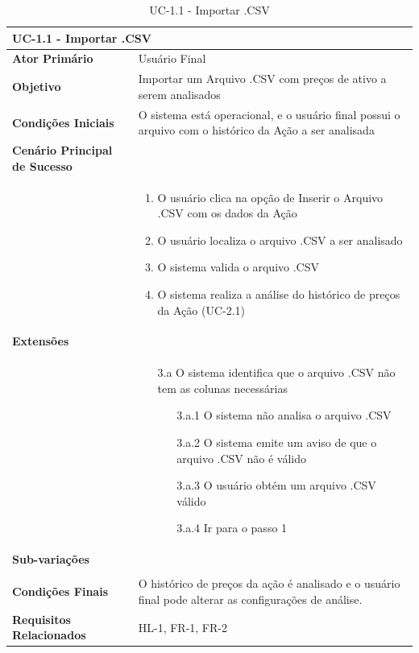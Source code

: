 \documentclass[12pt]{article}
\begin{document}
\begingroup
\renewcommand*{\arraystretch}{1.2}
\begin{table}[H]
	\caption{UC-1.1 - Importar .CSV}
	\label{tab:UC-1.1}
	\begin{tabular}{p{6cm} p{8cm}}
		\multicolumn{2}{l}{\large{\textbf{UC-1.1 - Importar .CSV}}}\\
		\toprule
		\textbf{Ator Primário}		&	Usuário Final \\
		\midrule
		\textbf{Objetivo}			&	Importar um Arquivo .CSV com preços de ativo a serem analisados \\
		\midrule
		\textbf{Condições Iniciais}	&	O sistema está operacional, e o usuário final possui
										o arquivo com o histórico da Ação a ser analisada \\
		\midrule
		\textbf{Cenário Principal de Sucesso}	& \\
		& \begin{enumerate}
			\item O usuário clica na opção de Inserir o Arquivo .CSV com os dados da Ação
			\item O usuário localiza o arquivo .CSV a ser analisado
			\item O sistema valida o arquivo .CSV
			\item O sistema realiza a análise do histórico de preços da Ação (UC-2.1)
		\end{enumerate}\\
		\midrule
		\textbf{Extensões}	& \\
		& \begin{enumerate}
			\item[3.a] O sistema identifica que o arquivo .CSV não tem as colunas necessárias
			\begin{enumerate}
				\item[3.a.1] O sistema não analisa o arquivo .CSV
				\item[3.a.2] O sistema emite um aviso de que o arquivo .CSV não é válido
				\item[3.a.3] O usuário obtém um arquivo .CSV válido
				\item[3.a.4] Ir para o passo 1 
			\end{enumerate}
		\end{enumerate}\\
		\midrule
		\textbf{Sub-variações} & \\
		& \\
		\midrule
		\textbf{Condições Finais} & O histórico de preços da ação é analisado e o usuário final
									pode alterar as configurações de análise. \\
		\midrule
		\textbf{Requisitos Relacionados} & HL-1, FR-1, FR-2 \\
		\bottomrule
	\end{tabular}		
\end{table}
\end{document}
